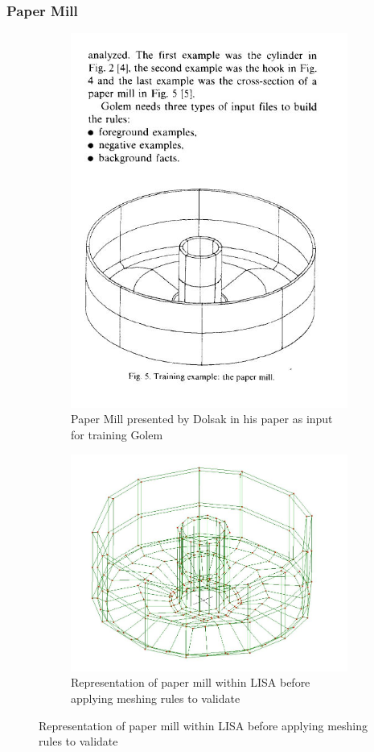 \documentclass{article}
\begin{document}
\subsubsection{Paper Mill}

\begin{figure}
\centering
\begin{subfigure}{.5\textwidth}
  \centering
  \includegraphics[width=0.9\linewidth]{PaperMillDolsak.jpeg}
  \caption{Paper Mill presented by Dolsak in his paper as input for training Golem}
  \label{fig:sub1}
\end{subfigure}%
\begin{subfigure}{.5\textwidth}
  \centering
  \includegraphics[width=0.9\linewidth]{PaperMillWithinLisa.jpeg}
  \caption{Representation of paper mill within LISA before applying meshing rules to validate}
  \label{fig:sub2}
\end{subfigure}
\label{fig:test}
\end{figure}
\end{document}
